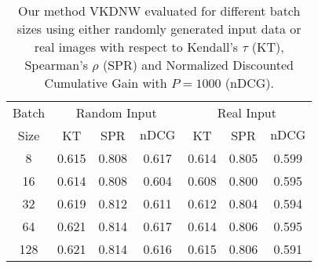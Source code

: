 \begin{table}
  \centering
  \small
  \begin{tabular}{c|ccc|ccc}
  \hline
Batch & \multicolumn{3}{c|}{Random Input} & \multicolumn{3}{c}{Real Input} \\ \cline{2-7}
 Size & KT & SPR & $\text{nDCG}$ & KT & SPR & $\text{nDCG}$ \\
\hline
8 & 0.615 & 0.808 & 0.617 & 0.614 & 0.805 & 0.599 \\
16 & 0.614 & 0.808 & 0.604 & 0.608 & 0.800 & 0.595 \\
32 & 0.619 & 0.812 & 0.611 & 0.612 & 0.804 & 0.594 \\
64 & 0.621 & 0.814 & 0.617 & 0.614 & 0.806 & 0.595 \\
128 & 0.621 & 0.814 & 0.616 & 0.615 & 0.806 & 0.591 \\
\hline
  \end{tabular}%
  \caption{Our method VKDNW evaluated for different batch sizes using either randomly generated input data or real images with respect to Kendall's $\tau$ (KT), Spearman's $\rho$ (SPR) and Normalized Discounted Cumulative Gain with $P=1000$ (nDCG).%
  }
    \label{tab:real_vs_random}
\end{table}

